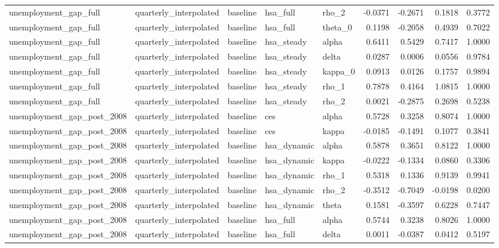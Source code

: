 \begin{tabular}{lllllrrrr}
unemployment\_gap\_full & quarterly\_interpolated & baseline & hsa\_full & rho\_2 & -0.0371 & -0.2671 & 0.1818 & 0.3772 \\
unemployment\_gap\_full & quarterly\_interpolated & baseline & hsa\_full & theta\_0 & 0.1198 & -0.2058 & 0.4939 & 0.7022 \\
unemployment\_gap\_full & quarterly\_interpolated & baseline & hsa\_steady & alpha & 0.6411 & 0.5429 & 0.7417 & 1.0000 \\
unemployment\_gap\_full & quarterly\_interpolated & baseline & hsa\_steady & delta & 0.0287 & 0.0006 & 0.0556 & 0.9784 \\
unemployment\_gap\_full & quarterly\_interpolated & baseline & hsa\_steady & kappa\_0 & 0.0913 & 0.0126 & 0.1757 & 0.9894 \\
unemployment\_gap\_full & quarterly\_interpolated & baseline & hsa\_steady & rho\_1 & 0.7878 & 0.4164 & 1.0815 & 1.0000 \\
unemployment\_gap\_full & quarterly\_interpolated & baseline & hsa\_steady & rho\_2 & 0.0021 & -0.2875 & 0.2698 & 0.5238 \\
unemployment\_gap\_post\_2008 & quarterly\_interpolated & baseline & ces & alpha & 0.5728 & 0.3258 & 0.8074 & 1.0000 \\
unemployment\_gap\_post\_2008 & quarterly\_interpolated & baseline & ces & kappa & -0.0185 & -0.1491 & 0.1077 & 0.3841 \\
unemployment\_gap\_post\_2008 & quarterly\_interpolated & baseline & hsa\_dynamic & alpha & 0.5878 & 0.3651 & 0.8122 & 1.0000 \\
unemployment\_gap\_post\_2008 & quarterly\_interpolated & baseline & hsa\_dynamic & kappa & -0.0222 & -0.1334 & 0.0860 & 0.3306 \\
unemployment\_gap\_post\_2008 & quarterly\_interpolated & baseline & hsa\_dynamic & rho\_1 & 0.5318 & 0.1336 & 0.9139 & 0.9941 \\
unemployment\_gap\_post\_2008 & quarterly\_interpolated & baseline & hsa\_dynamic & rho\_2 & -0.3512 & -0.7049 & -0.0198 & 0.0200 \\
unemployment\_gap\_post\_2008 & quarterly\_interpolated & baseline & hsa\_dynamic & theta & 0.1581 & -0.3597 & 0.6228 & 0.7447 \\
unemployment\_gap\_post\_2008 & quarterly\_interpolated & baseline & hsa\_full & alpha & 0.5744 & 0.3238 & 0.8026 & 1.0000 \\
unemployment\_gap\_post\_2008 & quarterly\_interpolated & baseline & hsa\_full & delta & 0.0011 & -0.0387 & 0.0412 & 0.5197 \\

\end{tabular}
